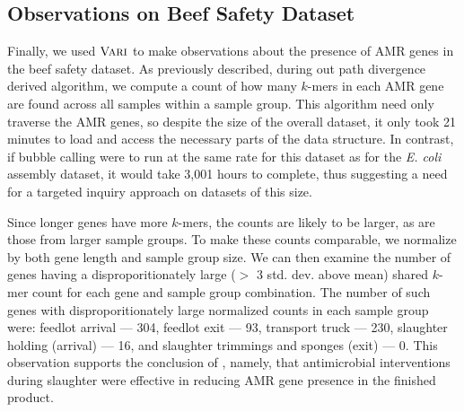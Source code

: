 \subsection{Observations on Beef Safety Dataset}

Finally, we used $\mbox{\rm {\sc Vari}}$ to make observations about the presence of AMR genes in the beef safety dataset.  As previously described, during out path divergence derived algorithm, we compute a count of how many $k$-mers in each AMR gene are found across all samples within a sample group.  This algorithm need only traverse the AMR genes, so despite the size of the overall dataset, it only took 21 minutes to load and access the necessary parts of the data structure.  In contrast, if bubble calling were to run at the same rate for this dataset as for the {\it E. coli} assembly dataset, it would take 3,001 hours to complete, thus suggesting a need for a targeted inquiry approach on datasets of this size.  

Since longer genes have more $k$-mers, the counts are likely to be larger, as are those from larger sample groups.  To make these counts comparable, we normalize by both gene length and sample group size.  We can then examine the number of genes having a disproporitionately large ($>$ 3 std. dev. above mean) shared $k$-mer count for each gene and sample group combination.  The number of such genes with disproporitionately large normalized counts in each sample group were:  feedlot arrival --- 304, feedlot exit --- 93, transport truck --- 230, slaughter holding (arrival) --- 16, and slaughter trimmings and sponges (exit) --- 0.
This observation supports the conclusion of \cite{noyes2016resistome}, namely, that antimicrobial interventions during slaughter were effective in reducing AMR gene presence in the finished product. 

